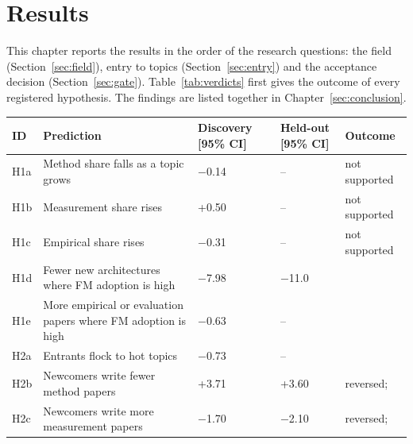 \chapter{Results}
\label{sec:results}

This chapter reports the results in the order of the research questions: the field (Section~\ref{sec:field}), entry to
topics (Section~\ref{sec:entry}) and the acceptance decision (Section~\ref{sec:gate}). Table~\ref{tab:verdicts} first
gives the outcome of every registered hypothesis. The findings are listed together in Chapter~\ref{sec:conclusion}.

\begin{table}[tb]
\centering
\footnotesize
\setlength{\tabcolsep}{3pt}
\renewcommand{\arraystretch}{1.1}
\begin{tabularx}{\textwidth}{@{}l Y L{2.6cm} L{2.6cm} L{2.6cm}@{}}
\toprule
ID & Prediction & Discovery [95\% CI] & Held-out [95\% CI] & Outcome \\
\midrule
H1a & Method share falls as a topic grows & $-$0.14\newline[$-$1.8, +1.5] & -- & not supported \\
H1b & Measurement share rises & +0.50\newline[$-$0.8, +1.8] & -- & not supported \\
H1c & Empirical share rises & $-$0.31\newline[$-$1.3, +0.7] & -- & not supported \\
H1d & Fewer new architectures where FM adoption is high & $-$7.98\newline[$-$12.14, $-$3.82] & $-$11.0\newline[$-$18.1, $-$3.9]
&  \\
H1e & More empirical or evaluation papers where FM adoption is high & $-$0.63\newline[$-$3.64, +2.38] & -- &
 \\
\addlinespace
H2a & Entrants flock to hot topics & $-$0.73\newline[$-$2.68, +1.22] & -- &  \\
H2b & Newcomers write fewer method papers & +3.71\newline[+2.61, +4.80] & +3.60\newline[+1.48, +5.71] & reversed;
 \\
H2c & Newcomers write more measurement papers & $-$1.70\newline[$-$2.46, $-$0.93] & $-$2.10\newline[$-$3.35, $-$0.85] & reversed;

\end{tabularx}
\end{table}
